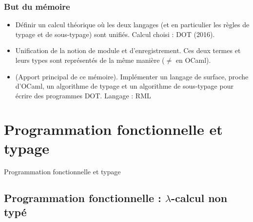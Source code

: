 \documentclass{beamer}
\begin{document}
\begin{frame}
  \frametitle{But du mémoire}
  \begin{itemize}
  \item Définir un calcul théorique où les deux langages (et en particulier les
    règles de typage et de sous-typage) sont unifiés. Calcul choisi : DOT (2016).
  \item Unification de la notion de module et d'enregistrement. Ces deux termes
    et leurs types sont représentés de la même manière ($\neq$ en OCaml).
  \item (Apport principal de ce mémoire). Implémenter un langage de surface, proche d'OCaml, un algorithme de
    typage et un algorithme de sous-typage pour écrire des programmes DOT.
    Langage : RML
  \end{itemize}
\end{frame}

\section{Programmation fonctionnelle et typage}

\begin{frame}
	\begin{center}
		\Huge{Programmation fonctionnelle et typage}
	\end{center}
\end{frame}

\subsection*{Programmation fonctionnelle : $\lambda$-calcul non typé}
\end{document}

